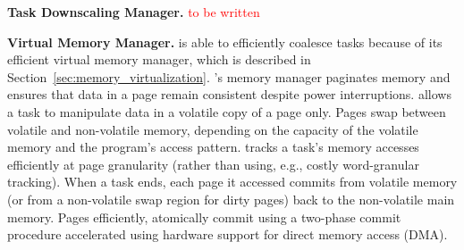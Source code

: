 \textbf{\sys Task Downscaling Manager.} \textcolor{red}{to be written}
 
\textbf{\sys Virtual Memory Manager.}  \sys is able to efficiently coalesce tasks because of its efficient virtual memory manager, which is described in Section~\ref{sec:memory_virtualization}. \sys's memory manager paginates memory and ensures that data in a page remain consistent despite power interruptions. \sys allows a task to manipulate data in a volatile copy of a page only. Pages swap between volatile and non-volatile memory, depending on the capacity of the volatile memory and the program's access pattern. \sys tracks a task's memory accesses efficiently at page granularity (rather than using, e.g., costly word-granular tracking). When a task ends, each page it accessed commits from volatile memory (or from a non-volatile swap region for dirty pages) back to the non-volatile main memory. Pages efficiently, atomically commit using a two-phase commit procedure accelerated using hardware support for direct memory access (DMA).